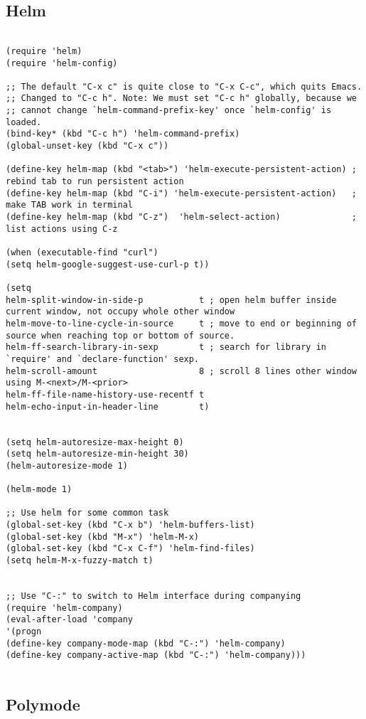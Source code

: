 \documentclass[11pt]{article}
\begin{document}
\subsection{Helm}
\label{sec:org4261dd5}
\begin{verbatim}

(require 'helm)
(require 'helm-config)

;; The default "C-x c" is quite close to "C-x C-c", which quits Emacs.
;; Changed to "C-c h". Note: We must set "C-c h" globally, because we
;; cannot change `helm-command-prefix-key' once `helm-config' is loaded.
(bind-key* (kbd "C-c h") 'helm-command-prefix)
(global-unset-key (kbd "C-x c"))

(define-key helm-map (kbd "<tab>") 'helm-execute-persistent-action) ; rebind tab to run persistent action
(define-key helm-map (kbd "C-i") 'helm-execute-persistent-action)   ; make TAB work in terminal
(define-key helm-map (kbd "C-z")  'helm-select-action)              ; list actions using C-z

(when (executable-find "curl")
(setq helm-google-suggest-use-curl-p t))

(setq 
helm-split-window-in-side-p           t ; open helm buffer inside current window, not occupy whole other window
helm-move-to-line-cycle-in-source     t ; move to end or beginning of source when reaching top or bottom of source.
helm-ff-search-library-in-sexp        t ; search for library in `require' and `declare-function' sexp.
helm-scroll-amount                    8 ; scroll 8 lines other window using M-<next>/M-<prior>
helm-ff-file-name-history-use-recentf t
helm-echo-input-in-header-line        t)


(setq helm-autoresize-max-height 0)
(setq helm-autoresize-min-height 30)
(helm-autoresize-mode 1)

(helm-mode 1)

;; Use helm for some common task
(global-set-key (kbd "C-x b") 'helm-buffers-list)
(global-set-key (kbd "M-x") 'helm-M-x)
(global-set-key (kbd "C-x C-f") 'helm-find-files)
(setq helm-M-x-fuzzy-match t)


;; Use "C-:" to switch to Helm interface during companying
(require 'helm-company)
(eval-after-load 'company
'(progn
(define-key company-mode-map (kbd "C-:") 'helm-company)
(define-key company-active-map (kbd "C-:") 'helm-company))) 


\end{verbatim}

\subsection{Polymode}
\label{sec:org3bed63b}
\end{document}
